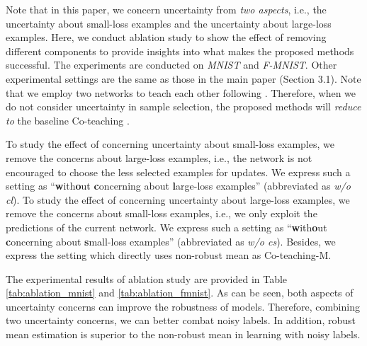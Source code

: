 \documentclass[11pt]{article}
\begin{document}
Note that in this paper, we concern uncertainty from \textit{two aspects}, i.e., the uncertainty about small-loss examples and the uncertainty about large-loss examples. Here, we conduct ablation study to show the effect of removing different components to provide insights into what makes the proposed methods successful. The experiments are conducted on \textit{MNIST} and \textit{F-MNIST}. Other experimental settings are the same as those in the main paper (Section 3.1). Note that we employ two networks to teach each other following \cite{han2018co}. Therefore, when we do not consider uncertainty in sample selection, the proposed methods will \textit{reduce to} the baseline Co-teaching \cite{han2018co}. 

To study the effect of concerning uncertainty about small-loss examples, we remove the concerns about large-loss examples, i.e., the network is not encouraged to choose the less selected examples for updates. We express such a setting as ``\textbf{w}ith\textbf{o}ut \textbf{c}oncerning about \textbf{l}arge-loss examples'' (abbreviated as \textit{w/o cl}). To study the effect of concerning uncertainty about large-loss examples, we remove the concerns about small-loss examples, i.e., we only exploit the predictions of the current network.  We express such a setting as ``\textbf{w}ith\textbf{o}ut \textbf{c}oncerning about \textbf{s}mall-loss examples'' (abbreviated as \textit{w/o cs}). Besides, we express the setting which directly uses non-robust mean as Co-teaching-M.

The experimental results of ablation study are provided in Table \ref{tab:ablation_mnist} and \ref{tab:ablation_fmnist}. As can be seen, both aspects of uncertainty concerns can improve the robustness of models. Therefore, combining two uncertainty concerns, we can better combat noisy labels. In addition, robust mean estimation is superior to the non-robust mean in learning with noisy labels.
\end{document}
